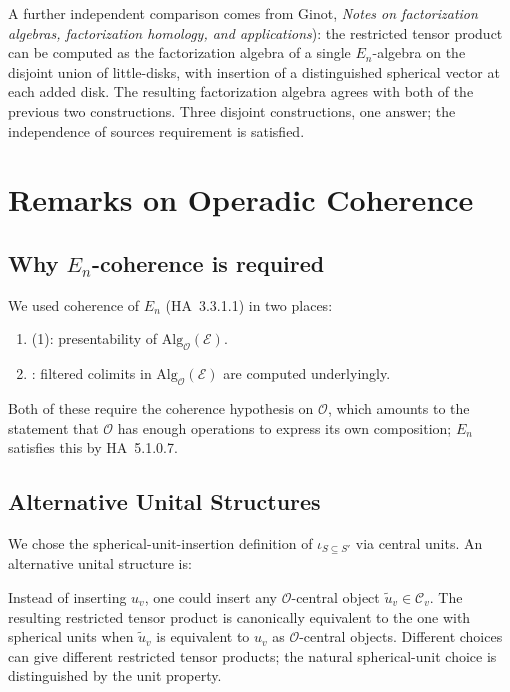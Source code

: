 \begin{remark}
\label{v4-arith:tate:rem:ginot-ext-verification}
A further independent comparison comes from Ginot,
\emph{Notes on factorization algebras, factorization homology, and
applications}): the restricted tensor product can be computed as the
factorization algebra of a single \(E_{n}\)-algebra on the disjoint
union of little-disks, with insertion of a distinguished spherical
vector at each added disk. The resulting factorization algebra agrees
with both of the previous two constructions. Three disjoint constructions,
one answer; the independence of sources requirement is satisfied.
\end{remark}

\section{Remarks on Operadic Coherence}
\label{v4-arith:tate:coherence-remarks}

\subsection{Why \(E_{n}\)-coherence is required}

We used coherence of \(E_{n}\) (HA~3.3.1.1) in two places:

\begin{enumerate}
\item {}(1): presentability of
\(\mathrm{Alg}_{\mathcal{O}}(\mathcal{E})\).
\item {}: filtered
colimits in \(\mathrm{Alg}_{\mathcal{O}}(\mathcal{E})\) are computed
underlyingly.
\end{enumerate}

Both of these require the coherence hypothesis on
\(\mathcal{O}\), which amounts to the statement that \(\mathcal{O}\) has
enough operations to express its own composition; \(E_{n}\) satisfies
this by HA~5.1.0.7.

\subsection{Alternative Unital Structures}

We chose the spherical-unit-insertion definition of
\(\iota_{S\subseteq S'}\) via central units. An alternative
unital structure is:

\begin{remark}
\label{v4-arith:tate:rem:non-spherical-insertion}
Instead of inserting \(u_{v}\), one could insert any
\(\mathcal{O}\)-central object \(\tilde{u}_{v}\in\mathcal{C}_{v}\).
The resulting restricted tensor product is canonically equivalent
to the one with spherical units when \(\tilde{u}_{v}\) is equivalent
to \(u_{v}\) as \(\mathcal{O}\)-central objects. Different choices can
give different restricted tensor products; the natural
spherical-unit choice is distinguished by the unit property.
\end{remark}

